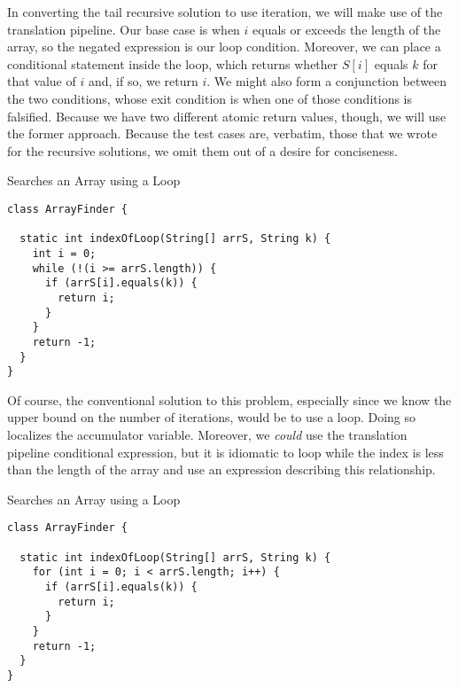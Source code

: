 In converting the tail recursive solution to use iteration, we will make use of the translation pipeline. Our base case is when $i$ equals or exceeds the length of the array, so the negated expression is our loop condition. Moreover, we can place a conditional statement inside the loop, which returns whether $S[i]$ equals $k$ for that value of $i$ and, if so, we return $i$. We might also form a conjunction between the two conditions, whose exit condition is when one of those conditions is falsified. Because we have two different atomic return values, though, we will use the former approach. Because the test cases are, verbatim, those that we wrote for the recursive solutions, we omit them out of a desire for conciseness.

\begin{cl}[]{Searches an Array using a  Loop}
\begin{lstlisting}[language=MyJava]
class ArrayFinder {

  static int indexOfLoop(String[] arrS, String k) {
    int i = 0;
    while (!(i >= arrS.length)) {
      if (arrS[i].equals(k)) { 
        return i; 
      }
    }
    return -1;
  }
}
\end{lstlisting}
\end{cl}

Of course, the conventional solution to this problem, especially since we know the upper bound on the number of iterations, would be to use a  loop. Doing so localizes the accumulator variable. Moreover, we \emph{could} use the translation pipeline conditional expression, but it is idiomatic to loop while the index is less than the length of the array and use an expression describing this relationship.

\begin{cl}[]{Searches an Array using a  Loop}
\begin{lstlisting}[language=MyJava]
class ArrayFinder {
  
  static int indexOfLoop(String[] arrS, String k) {
    for (int i = 0; i < arrS.length; i++) {
      if (arrS[i].equals(k)) { 
        return i; 
      }
    }
    return -1;
  }
}
\end{lstlisting}
\end{cl}


